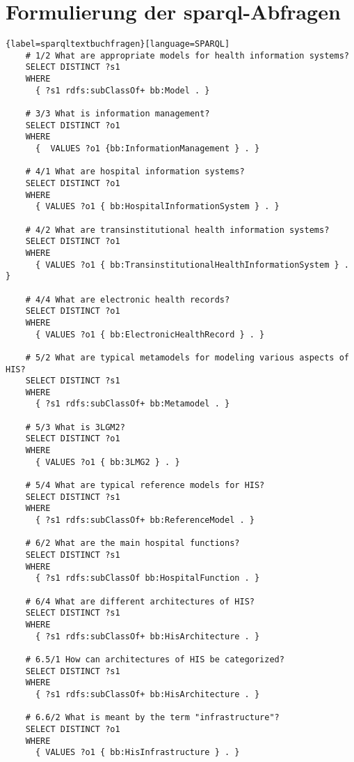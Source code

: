 \section[Formulierung der SPARQL-Abfragen]{Formulierung der \ac{sparql}-Abfragen}\label{sub:sparqltextbuchfragen}

\begin{lstlisting}{label=sparqltextbuchfragen}[language=SPARQL]
    # 1/2 What are appropriate models for health information systems?
    SELECT DISTINCT ?s1
    WHERE
      { ?s1 rdfs:subClassOf+ bb:Model . }
    
    # 3/3 What is information management?
    SELECT DISTINCT ?o1
    WHERE
      {  VALUES ?o1 {bb:InformationManagement } . }
    
    # 4/1 What are hospital information systems?
    SELECT DISTINCT ?o1
    WHERE
      { VALUES ?o1 { bb:HospitalInformationSystem } . }
    
    # 4/2 What are transinstitutional health information systems?
    SELECT DISTINCT ?o1
    WHERE
      { VALUES ?o1 { bb:TransinstitutionalHealthInformationSystem } . }
    
    # 4/4 What are electronic health records?
    SELECT DISTINCT ?o1
    WHERE
      { VALUES ?o1 { bb:ElectronicHealthRecord } . }
    
    # 5/2 What are typical metamodels for modeling various aspects of HIS?
    SELECT DISTINCT ?s1
    WHERE
      { ?s1 rdfs:subClassOf+ bb:Metamodel . }
    
    # 5/3 What is 3LGM2?
    SELECT DISTINCT ?o1
    WHERE
      { VALUES ?o1 { bb:3LMG2 } . }
    
    # 5/4 What are typical reference models for HIS?
    SELECT DISTINCT ?s1
    WHERE
      { ?s1 rdfs:subClassOf+ bb:ReferenceModel . }
    
    # 6/2 What are the main hospital functions?
    SELECT DISTINCT ?s1
    WHERE
      { ?s1 rdfs:subClassOf bb:HospitalFunction . }
    
    # 6/4 What are different architectures of HIS?
    SELECT DISTINCT ?s1
    WHERE
      { ?s1 rdfs:subClassOf+ bb:HisArchitecture . }
    
    # 6.5/1 How can architectures of HIS be categorized?
    SELECT DISTINCT ?s1
    WHERE
      { ?s1 rdfs:subClassOf+ bb:HisArchitecture . }
    
    # 6.6/2 What is meant by the term "infrastructure"?
    SELECT DISTINCT ?o1
    WHERE
      { VALUES ?o1 { bb:HisInfrastructure } . }
    

\end{lstlisting}
